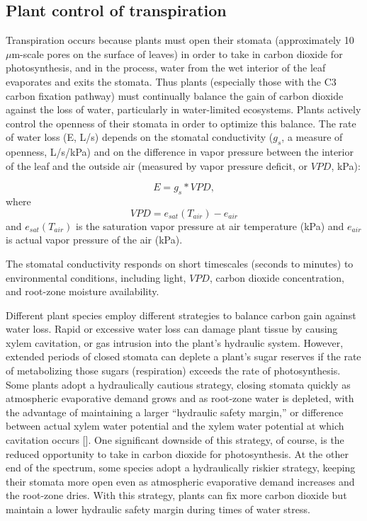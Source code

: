 \subsection{Plant control of transpiration}

Transpiration occurs because plants must open their stomata (approximately 10 $\mu$m-scale pores on the surface of leaves) in order to take in carbon dioxide for photosynthesis, and in the process, water from the wet interior of the leaf evaporates and exits the stomata.  Thus plants (especially those with the C3 carbon fixation pathway) must continually balance the gain of carbon dioxide against the loss of water, particularly in water-limited ecosystems.  Plants actively control the openness of their stomata in order to optimize this balance.  The rate of water loss (E, L/s) depends on the stomatal conductivity ($g_s$, a measure of openness, L/s/kPa) and on the difference in vapor pressure between the interior of the leaf and the outside air (measured by vapor pressure deficit, or $VPD$, kPa):

\begin{equation}
E = g_s * VPD ,
\end{equation}
where
\begin{equation}
VPD = e_{sat}(T_{air}) - e_{air}
\end{equation}
and $e_{sat}(T_{air})$ is the saturation vapor pressure at air temperature (kPa) and $e_{air}$ is actual vapor pressure of the air (kPa).

The stomatal conductivity responds on short timescales (seconds to minutes) to environmental conditions, including light, $VPD$, carbon dioxide concentration, and root-zone moisture availability.

Different plant species employ different strategies to balance carbon gain against water loss.  Rapid or excessive water loss can damage plant tissue by causing xylem cavitation, or gas intrusion into the plant's hydraulic system.  However, extended periods of closed stomata can deplete a plant's sugar reserves if the rate of metabolizing those sugars (respiration) exceeds the rate of photosynthesis.  Some plants adopt a hydraulically cautious strategy, closing stomata quickly as atmospheric evaporative demand grows and as root-zone water is depleted, with the advantage of maintaining a larger ``hydraulic safety margin,'' or difference between actual xylem water potential and the xylem water potential at which cavitation occurs [\cite{choat2012global}]. One significant downside of this strategy, of course, is the reduced opportunity to take in carbon dioxide for photosynthesis.  At the other end of the spectrum, some species adopt a hydraulically riskier strategy, keeping their stomata more open even as atmospheric evaporative demand increases and the root-zone dries.  With this strategy, plants can fix more carbon dioxide but maintain a lower hydraulic safety margin during times of water stress.

